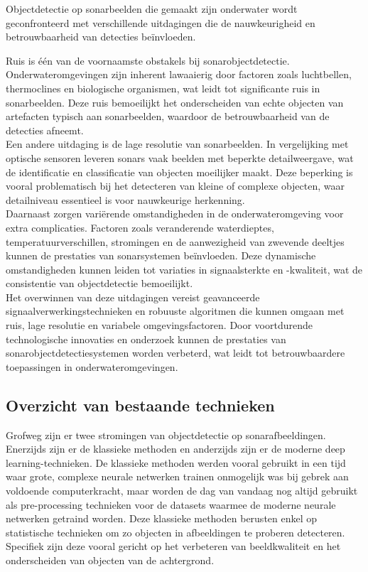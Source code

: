 Objectdetectie op sonarbeelden die gemaakt zijn onderwater wordt geconfronteerd met verschillende uitdagingen die de nauwkeurigheid en betrouwbaarheid van detecties beïnvloeden.

Ruis is één van de voornaamste obstakels bij sonarobjectdetectie. Onderwateromgevingen zijn inherent lawaaierig door factoren zoals luchtbellen, \glspl{thermocline} en biologische organismen, wat leidt tot significante ruis in sonarbeelden. Deze ruis bemoeilijkt het onderscheiden van echte objecten van artefacten typisch aan sonarbeelden, waardoor de betrouwbaarheid van de detecties afneemt. \autocite{Aubard_2024_Datasets} \\

Een andere uitdaging is de lage resolutie van sonarbeelden. In vergelijking met optische sensoren leveren sonars vaak beelden met beperkte detailweergave, wat de identificatie en classificatie van objecten moeilijker maakt. Deze beperking is vooral problematisch bij het detecteren van kleine of complexe objecten, waar detailniveau essentieel is voor nauwkeurige herkenning. \autocite{Lee_2018} \\

Daarnaast zorgen variërende omstandigheden in de onderwateromgeving voor extra complicaties. Factoren zoals veranderende waterdieptes, temperatuurverschillen, stromingen en de aanwezigheid van zwevende deeltjes kunnen de prestaties van sonarsystemen beïnvloeden. Deze dynamische omstandigheden kunnen leiden tot variaties in signaalsterkte en -kwaliteit, wat de consistentie van objectdetectie bemoeilijkt. \autocite{Valdenegro_Toro_2019} \\

Het overwinnen van deze uitdagingen vereist geavanceerde signaalverwerkingstechnieken en robuuste algoritmen die kunnen omgaan met ruis, lage resolutie en variabele omgevingsfactoren. Door voortdurende technologische innovaties en onderzoek kunnen de prestaties van sonarobjectdetectiesystemen worden verbeterd, wat leidt tot betrouwbaardere toepassingen in onderwateromgevingen.

\subsection{Overzicht van bestaande technieken}

Grofweg zijn er twee stromingen van objectdetectie op sonarafbeeldingen. Enerzijds zijn er de klassieke methoden en anderzijds zijn er de moderne deep learning-technieken. De klassieke methoden werden vooral gebruikt in een tijd waar grote, complexe neurale netwerken trainen onmogelijk was bij gebrek aan voldoende computerkracht, maar worden de dag van vandaag nog altijd gebruikt als pre-processing technieken voor de datasets waarmee de moderne neurale netwerken getraind worden. Deze klassieke methoden berusten enkel op statistische technieken om zo objecten in afbeeldingen te proberen detecteren. Specifiek zijn deze vooral gericht op het verbeteren van beeldkwaliteit en het onderscheiden van objecten van de achtergrond.

